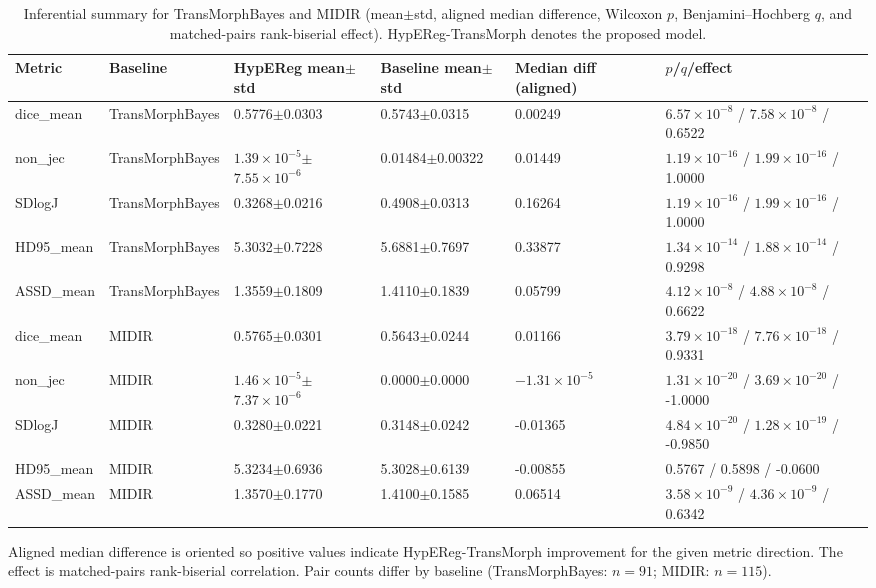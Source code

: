 \documentclass[11pt,a4paper]{article}
\begin{document}
\begin{table}[H]
\caption{Inferential summary for TransMorphBayes and MIDIR (mean\(\pm\)std, aligned median difference, Wilcoxon \(p\), Benjamini--Hochberg \(q\), and matched-pairs rank-biserial effect). HypEReg-TransMorph denotes the proposed model.}
\scriptsize
\setlength{\tabcolsep}{3pt}
\renewcommand{\arraystretch}{1.1}
\begin{tabularx}{\textwidth}{llXXXX}
\toprule
\textbf{Metric} & \textbf{Baseline} & \textbf{HypEReg mean\(\pm\)std} & \textbf{Baseline mean\(\pm\)std} & \textbf{Median diff (aligned)} & \textbf{\(p\)/\(q\)/effect}\\
\midrule
dice\_mean & TransMorphBayes & 0.5776\(\pm\)0.0303 & 0.5743\(\pm\)0.0315 & 0.00249 & \(6.57\times10^{-8}\) / \(7.58\times10^{-8}\) / 0.6522\\
non\_jec & TransMorphBayes & \(1.39\times10^{-5}\)\(\pm\)\(7.55\times10^{-6}\) & 0.01484\(\pm\)0.00322 & 0.01449 & \(1.19\times10^{-16}\) / \(1.99\times10^{-16}\) / 1.0000\\
SDlogJ & TransMorphBayes & 0.3268\(\pm\)0.0216 & 0.4908\(\pm\)0.0313 & 0.16264 & \(1.19\times10^{-16}\) / \(1.99\times10^{-16}\) / 1.0000\\
HD95\_mean & TransMorphBayes & 5.3032\(\pm\)0.7228 & 5.6881\(\pm\)0.7697 & 0.33877 & \(1.34\times10^{-14}\) / \(1.88\times10^{-14}\) / 0.9298\\
ASSD\_mean & TransMorphBayes & 1.3559\(\pm\)0.1809 & 1.4110\(\pm\)0.1839 & 0.05799 & \(4.12\times10^{-8}\) / \(4.88\times10^{-8}\) / 0.6622\\
\midrule
dice\_mean & MIDIR & 0.5765\(\pm\)0.0301 & 0.5643\(\pm\)0.0244 & 0.01166 & \(3.79\times10^{-18}\) / \(7.76\times10^{-18}\) / 0.9331\\
non\_jec & MIDIR & \(1.46\times10^{-5}\)\(\pm\)\(7.37\times10^{-6}\) & 0.0000\(\pm\)0.0000 & \(-1.31\times10^{-5}\) & \(1.31\times10^{-20}\) / \(3.69\times10^{-20}\) / -1.0000\\
SDlogJ & MIDIR & 0.3280\(\pm\)0.0221 & 0.3148\(\pm\)0.0242 & -0.01365 & \(4.84\times10^{-20}\) / \(1.28\times10^{-19}\) / -0.9850\\
HD95\_mean & MIDIR & 5.3234\(\pm\)0.6936 & 5.3028\(\pm\)0.6139 & -0.00855 & 0.5767 / 0.5898 / -0.0600\\
ASSD\_mean & MIDIR & 1.3570\(\pm\)0.1770 & 1.4100\(\pm\)0.1585 & 0.06514 & \(3.58\times10^{-9}\) / \(4.36\times10^{-9}\) / 0.6342\\
\bottomrule
\end{tabularx}
\parbox{\textwidth}{\footnotesize Aligned median difference is oriented so positive values indicate HypEReg-TransMorph improvement for the given metric direction. The effect is matched-pairs rank-biserial correlation. Pair counts differ by baseline (TransMorphBayes: \(n=91\); MIDIR: \(n=115\)).}
\end{table}
\end{document}
